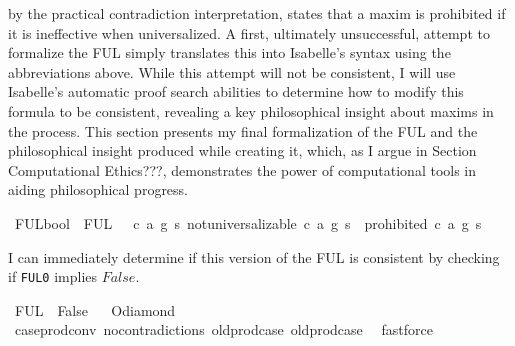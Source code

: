 \begin{isabellebody}
\begin{isamarkuptext}
by the practical contradiction interpretation, states that a maxim is prohibited if it is ineffective
when universalized. A first, ultimately unsuccessful, attempt to formalize the FUL simply translates this into Isabelle's syntax
using the abbreviations above. While this attempt will not be consistent, I will use Isabelle's automatic
proof search abilities to determine how to modify this formula to be consistent, revealing a key philosophical
insight about maxims in the process. This section presents my final formalization of the FUL and the 
philosophical insight produced while creating it, which, as I argue in Section Computational Ethics???,
demonstrates the power of computational tools in aiding philosophical progress.%
\end{isamarkuptext}\isamarkuptrue%
\isamarkupfalse%
\ FUL{}{\isacharcolon}{\isacharcolon}bool\ \ {\isachardoublequoteopen}FUL{}\ {\isasymequiv}\ {\isasymforall}\ c\ a\ g\ s{\isachardot}\ not{\isacharunderscore}universalizable\ {\isacharparenleft}c{\isacharcomma}\ a{\isacharcomma}\ g{\isacharparenright}\ s\ {\isasymlongrightarrow}\ {\isasymTurnstile}{\isacharparenleft}{\isacharparenleft}prohibited\ {\isacharparenleft}c{\isacharcomma}\ a{\isacharcomma}\ g{\isacharparenright}\ s{\isacharparenright}{\isacharparenright}{\isachardoublequoteclose}\isanewline
%
%
\begin{isamarkuptext}%
I can immediately determine if this version of the FUL is consistent by checking if \texttt{FUL0} 
implies $False$.%
\end{isamarkuptext}\isamarkuptrue%
\isamarkupfalse%
\ {\isachardoublequoteopen}FUL{}\ {\isasymlongrightarrow}\ False{\isachardoublequoteclose}%
\isadelimproof
\ %
\endisadelimproof
%
\isatagproof
{}\isamarkupfalse%
\ O{\isacharunderscore}diamond\isanewline
\ \ \isamarkupfalse%
\ case{\isacharunderscore}prod{\isacharunderscore}conv\ no{\isacharunderscore}contradictions\ old{\isachardot}prod{\isachardot}case\ old{\isachardot}prod{\isachardot}case\ \isamarkupfalse%
\ fastforce%
\endisatagproof
{\isafoldproof}%
%
\isadelimproof

\end{isabellebody}
